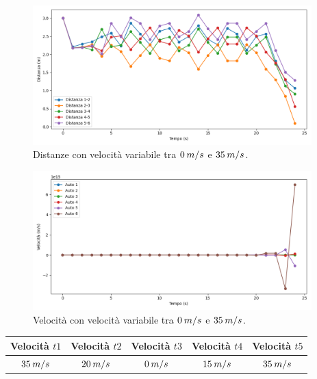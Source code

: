 \begin{figure}[H]
    \includegraphics[width=0.96\textwidth]{images/5-experiment/compost/distance_d+.png}
    \caption{Distanze con velocità variabile tra $0\hspace{0.2em}m/s$ e $35\hspace{0.2em}m/s$.}
    \label{fig:d-compost-distance}
\end{figure}

\begin{figure}[H]
    \includegraphics[width=0.96\textwidth]{images/5-experiment/compost/velocity_d+.png}
    \caption{Velocità con velocità variabile tra $0\hspace{0.2em}m/s$ e $35\hspace{0.2em}m/s$.}
    \label{fig:d-compost-velocity}
\end{figure}

\newpage

\begin{table}[h]
    \centering
    \begin{tabular}{|c|c|c|c|c|}
        \hline
        Velocità $t1$ & Velocità $t2$ & Velocità $t3$ &Velocità $t4$ &Velocità $t5$\\
        \hline
                $35\hspace{0.2em}m/s$ & $20\hspace{0.2em}m/s$ & $0\hspace{0.2em}m/s$ & $15\hspace{0.2em}m/s$ & $35\hspace{0.2em}m/s$ \\
        \hline
    \end{tabular}
\end{table}

